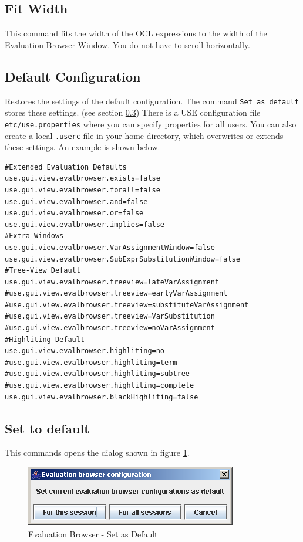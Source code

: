 \documentclass[a4paper,titlepage,oneside,final]{scrreprt} %
\begin{document}
\subsection{Fit Width}
This command fits the width of the OCL expressions to the width of the Evaluation Browser Window.
You do not have to scroll horizontally.
\subsection{Default Configuration}
Restores the settings of the default configuration.
The command \verb+Set as default+ stores these settings. (see section \ref{setToDefault})
There is a USE configuration file \verb+etc/use.properties+ where
you can specify properties for all users.
You can also create a local \verb+.userc+ file in your home directory, which
overwrites or extends these settings. An example is shown below.
\begin{verbatim}
#Extended Evaluation Defaults
use.gui.view.evalbrowser.exists=false
use.gui.view.evalbrowser.forall=false
use.gui.view.evalbrowser.and=false
use.gui.view.evalbrowser.or=false
use.gui.view.evalbrowser.implies=false
#Extra-Windows
use.gui.view.evalbrowser.VarAssignmentWindow=false
use.gui.view.evalbrowser.SubExprSubstitutionWindow=false
#Tree-View Default
use.gui.view.evalbrowser.treeview=lateVarAssignment
#use.gui.view.evalbrowser.treeview=earlyVarAssignment
#use.gui.view.evalbrowser.treeview=substituteVarAssignment
#use.gui.view.evalbrowser.treeview=VarSubstitution
#use.gui.view.evalbrowser.treeview=noVarAssignment
#Highliting-Default
use.gui.view.evalbrowser.highliting=no
#use.gui.view.evalbrowser.highliting=term
#use.gui.view.evalbrowser.highliting=subtree
#use.gui.view.evalbrowser.highliting=complete
use.gui.view.evalbrowser.blackHighliting=false
\end{verbatim}
\subsection{Set to default}\label{setToDefault}
This commands opens the dialog shown in figure \ref{fig:EvaluationBrowserSetAsDefault}.
\begin{figure}[ht]
\centering
\includegraphics[scale=0.7]{Screenshots/GUI/EvaluationBrowserSetAsDefault.png}
\caption{Evaluation Browser - Set as Default}
\label{fig:EvaluationBrowserSetAsDefault}
\end{figure}
\end{document}
